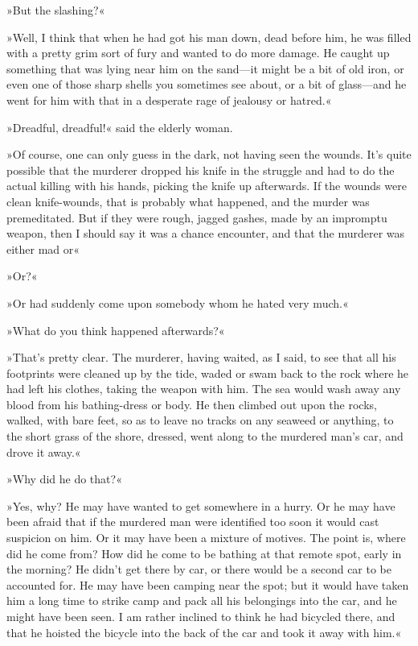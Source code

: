 »But the slashing?«

»Well, I think that when he had got his man down, dead before him, he was filled with a pretty grim sort of fury and wanted to do more damage. He caught up something that was lying near him on the sand—it might be a bit of old iron, or even one of those sharp shells you sometimes see about, or a bit of glass—and he went for him with that in a desperate rage of jealousy or hatred.«

»Dreadful, dreadful!« said the elderly woman.

»Of course, one can only guess in the dark, not having seen the wounds. It's quite possible that the murderer dropped his knife in the struggle and had to do the actual killing with his hands, picking the knife up afterwards. If the wounds were clean knife-wounds, that is probably what happened, and the murder was premeditated. But if they were rough, jagged gashes, made by an impromptu weapon, then I should say it was a chance encounter, and that the murderer was either mad or\longdash«

»Or?«

»Or had suddenly come upon somebody whom he hated very much.«

»What do you think happened afterwards?«

»That's pretty clear. The murderer, having waited, as I said, to see that all his footprints were cleaned up by the tide, waded or swam back to the rock where he had left his clothes, taking the weapon with him. The sea would wash away any blood from his bathing-dress or body. He then climbed out upon the rocks, walked, with bare feet, so as to leave no tracks on any seaweed or anything, to the short grass of the shore, dressed, went along to the murdered man's car, and drove it away.«

»Why did he do that?«

»Yes, why? He may have wanted to get somewhere in a hurry. Or he may have been afraid that if the murdered man were identified too soon it would cast suspicion on him. Or it may have been a mixture of motives. The point is, where did he come from? How did he come to be bathing at that remote spot, early in the morning? He didn't get there by car, or there would be a second car to be accounted for. He may have been camping near the spot; but it would have taken him a long time to strike camp and pack all his belongings into the car, and he might have been seen. I am rather inclined to think he had bicycled there, and that he hoisted the bicycle into the back of the car and took it away with him.«

